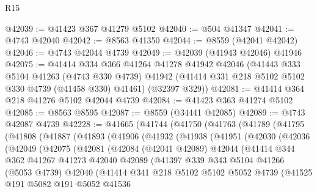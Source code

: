 \begin{lexlean}{R15}
\begin{coremodule}
{{{{{{{{{{{@42039 := @41423 @367 @41279 @5102
@42040 := @504 @41347
@42041 := @4743 @42040
@42042 := @8563 @41350
@42044 := @8559 (@42041 @42042)
@42046 := @4743 @42044 @4739
@42049 := @42039 (@41943 @42046) @41946
@42075 := @41414
    @334
    @366
    @41264
    @41278
    @41942
    @42046
    (@41443
      @333
      @5104
      @41263
      (@4743 @330 @4739)
      @41942
      (@41414 @331 @218 @5102 @5102 @330 @4739 (@41458 @330) @41461)
      (@32397 @329))
@42081 := @41414 @364 @218 @41276 @5102 @42044 @4739
@42084 := @41423 @363 @41274 @5102
@42085 := @8563 @8595
@42087 := @8559 (@34441 @42085)
@42089 := @4743 @42087 @4739
@42228 := @41665
    (@41744
      (@41750
        (@41763
          (@41789
            (@41795
              (@41808
                (@41887
                  (@41893
                    (@41906
                      (@41932
                        (@41938
                          (@41951
                            (@42030
                              (@42036
                                (@42049
                                  (@42075
                                    (@42081
                                      (@42084
                                        (@42041 @42089)
                                        @42044
                                        (@41414
                                          @344
                                          @362
                                          @41267
                                          @41273
                                          @42040
                                          @42089
                                          (@41397
                                            @339
                                            @343
                                            @5104
                                            @41266
                                            (@5053 @4739)
                                            @42040
                                            (@41414
                                              @341
                                              @218
                                              @5102
                                              @5102
                                              @5052
                                              @4739
                                              (@41525
                                                @191
                                                @5082
                                                @191
                                                @5052
                                                @41536
}}}}}}}}}}}
\end{coremodule}
\end{lexlean}
